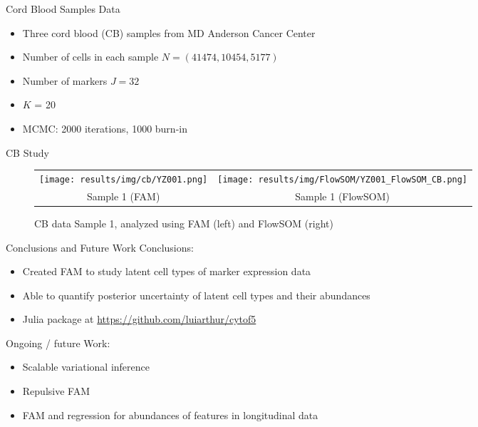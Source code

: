 \documentclass[ignorenonframetext,]{beamer}
\begin{document}
\begin{frame}{Cord Blood Samples Data}
  \begin{itemize}
    \setlength\itemsep{1em}
    \item Three cord blood (CB) samples from MD Anderson Cancer Center
    \item Number of cells in each sample $N = (41474,10454,5177)$
    \item Number of markers $J=32$
    \item $K$ = 20
    \item MCMC: 2000 iterations, 1000 burn-in
  \end{itemize}
\end{frame}

\begin{frame}{CB Study}
\vspace{-1em}\begin{figure}
  \begin{center}
  \begin{tabular}{cc}
  \texttt{[image: results/img/cb/YZ001.png]} &
  \texttt{[image: results/img/FlowSOM/YZ001\_FlowSOM\_CB.png]} \\
  {\small Sample 1 (FAM)} & {\small Sample 1 (FlowSOM)} \\
  \end{tabular}
  \end{center}
  \vspace{-0.05in}
  \caption{CB data Sample 1, analyzed using FAM (left) and FlowSOM (right)}
\end{figure}
\end{frame}

\begin{frame}{Conclusions and Future Work}
  Conclusions:
  \vspace{.5em}
  \begin{itemize}
    \setlength\itemsep{1em}
    \item Created FAM to study latent cell types of marker expression data
    \item Able to quantify posterior uncertainty of latent cell types and their abundances
    \item Julia package at {\color{blue}\url{https://github.com/luiarthur/cytof5}}
  \end{itemize}
  \vspace{1em}

  Ongoing / future Work:
  \vspace{.5em}
  \begin{itemize}
    \setlength\itemsep{1em}
    \item Scalable variational inference
    \item Repulsive FAM
    \item FAM and regression for abundances of features in longitudinal data
  \end{itemize}
\end{frame}
\end{document}
